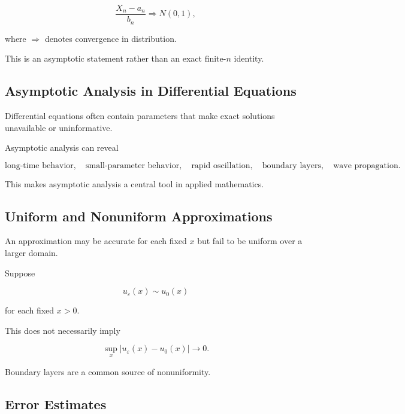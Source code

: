 \[
\boxed{
\frac{X_n-a_n}{b_n}
\Longrightarrow
N(0,1),
}
\]

where \(\Longrightarrow\) denotes convergence in distribution.

This is an asymptotic statement rather than an exact finite-\(n\)
identity.

\subsection{Asymptotic Analysis in Differential Equations}
\label{subsec:asymptotic-differential-equations}

Differential equations often contain parameters that make exact
solutions unavailable or uninformative.

Asymptotic analysis can reveal

\[
\boxed{
\text{long-time behavior},
\quad
\text{small-parameter behavior},
\quad
\text{rapid oscillation},
\quad
\text{boundary layers},
\quad
\text{wave propagation}.
}
\]

This makes asymptotic analysis a central tool in applied mathematics.

\subsection{Uniform and Nonuniform Approximations}
\label{subsec:uniform-nonuniform-asymptotics}

An approximation may be accurate for each fixed \(x\) but fail to be
uniform over a larger domain.

Suppose

\[
u_\varepsilon(x)
\sim
u_0(x)
\]

for each fixed \(x>0\).

This does not necessarily imply

\[
\boxed{
\sup_x
|u_\varepsilon(x)-u_0(x)|
\to0.
}
\]

Boundary layers are a common source of nonuniformity.

\subsection{Error Estimates}
\label{subsec:asymptotic-error-estimates}

